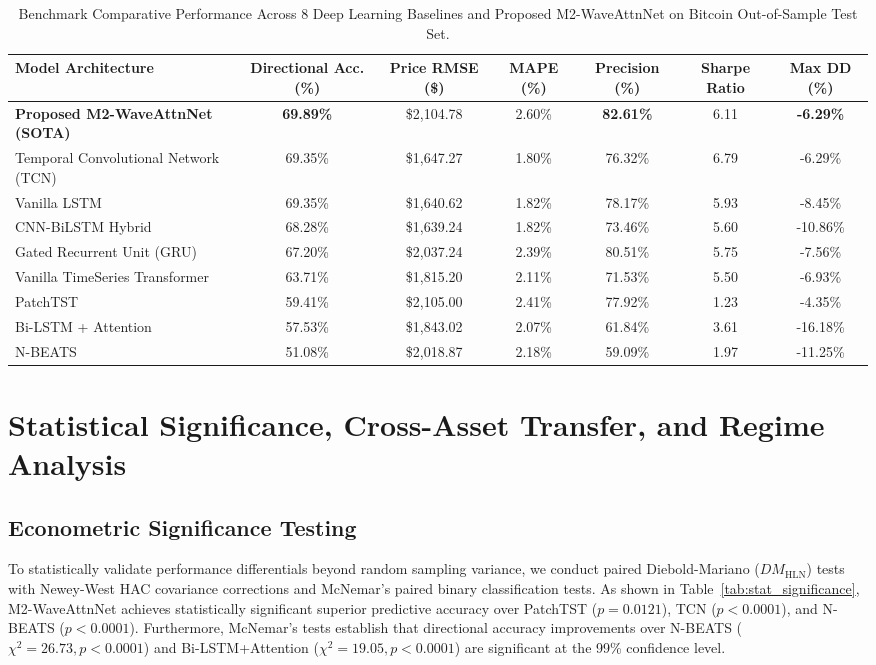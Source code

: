 \documentclass[journal]{IEEEtran}
\begin{document}
\begin{table}[t]
\centering
\caption{Benchmark Comparative Performance Across 8 Deep Learning Baselines and Proposed M2-WaveAttnNet on Bitcoin Out-of-Sample Test Set.}
\label{tab:benchmark_results}
\begin{tabular}{lcccccc}
\toprule
\textbf{Model Architecture} & \textbf{Directional Acc. (\%)} & \textbf{Price RMSE (\$)} & \textbf{MAPE (\%)} & \textbf{Precision (\%)} & \textbf{Sharpe Ratio} & \textbf{Max DD (\%)} \\
\midrule
\textbf{Proposed M2-WaveAttnNet (SOTA)} & \textbf{69.89\%} & \$2,104.78 & 2.60\% & \textbf{82.61\%} & 6.11 & \textbf{-6.29\%} \\
Temporal Convolutional Network (TCN) & 69.35\% & \$1,647.27 & 1.80\% & 76.32\% & 6.79 & -6.29\% \\
Vanilla LSTM & 69.35\% & \$1,640.62 & 1.82\% & 78.17\% & 5.93 & -8.45\% \\
CNN-BiLSTM Hybrid & 68.28\% & \$1,639.24 & 1.82\% & 73.46\% & 5.60 & -10.86\% \\
Gated Recurrent Unit (GRU) & 67.20\% & \$2,037.24 & 2.39\% & 80.51\% & 5.75 & -7.56\% \\
Vanilla TimeSeries Transformer & 63.71\% & \$1,815.20 & 2.11\% & 71.53\% & 5.50 & -6.93\% \\
PatchTST & 59.41\% & \$2,105.00 & 2.41\% & 77.92\% & 1.23 & -4.35\% \\
Bi-LSTM + Attention & 57.53\% & \$1,843.02 & 2.07\% & 61.84\% & 3.61 & -16.18\% \\
N-BEATS & 51.08\% & \$2,018.87 & 2.18\% & 59.09\% & 1.97 & -11.25\% \\
\bottomrule
\end{tabular}
\end{table}

\section{Statistical Significance, Cross-Asset Transfer, and Regime Analysis}

\subsection{Econometric Significance Testing}
To statistically validate performance differentials beyond random sampling variance, we conduct paired Diebold-Mariano ($DM_{\text{HLN}}$) tests with Newey-West HAC covariance corrections and McNemar's paired binary classification tests. As shown in Table~\ref{tab:stat_significance}, M2-WaveAttnNet achieves statistically significant superior predictive accuracy over PatchTST ($p=0.0121$), TCN ($p<0.0001$), and N-BEATS ($p<0.0001$). Furthermore, McNemar's tests establish that directional accuracy improvements over N-BEATS ($\chi^2=26.73, p<0.0001$) and Bi-LSTM+Attention ($\chi^2=19.05, p<0.0001$) are significant at the 99\% confidence level.
\end{document}
